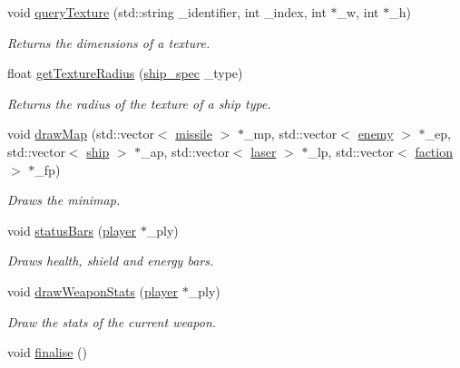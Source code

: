 \begin{DoxyCompactItemize}
\item 
void \hyperlink{classrenderer_a70a52c25aab83762d2e6a9e89a7e3f68}{query\-Texture} (std\-::string \-\_\-identifier, int \-\_\-index, int $\ast$\-\_\-w, int $\ast$\-\_\-h)
\begin{DoxyCompactList}\small\item\em Returns the dimensions of a texture. \end{DoxyCompactList}\item 
float \hyperlink{classrenderer_a560b721679d96689a77155fb4d2bf36a}{get\-Texture\-Radius} (\hyperlink{ship_8hpp_af74a63841701826d661cb9809aaf7092}{ship\-\_\-spec} \-\_\-type)
\begin{DoxyCompactList}\small\item\em Returns the radius of the texture of a ship type. \end{DoxyCompactList}\item 
void \hyperlink{classrenderer_a705585261bc8aeca559e96cfe558712e}{draw\-Map} (std\-::vector$<$ \hyperlink{classmissile}{missile} $>$ $\ast$\-\_\-mp, std\-::vector$<$ \hyperlink{classenemy}{enemy} $>$ $\ast$\-\_\-ep, std\-::vector$<$ \hyperlink{classship}{ship} $>$ $\ast$\-\_\-ap, std\-::vector$<$ \hyperlink{classlaser}{laser} $>$ $\ast$\-\_\-lp, std\-::vector$<$ \hyperlink{structfaction}{faction} $>$ $\ast$\-\_\-fp)
\begin{DoxyCompactList}\small\item\em Draws the minimap. \end{DoxyCompactList}\item 
void \hyperlink{classrenderer_a78e5ab3b46c708c369fddeac1202c692}{status\-Bars} (\hyperlink{classplayer}{player} $\ast$\-\_\-ply)
\begin{DoxyCompactList}\small\item\em Draws health, shield and energy bars. \end{DoxyCompactList}\item 
void \hyperlink{classrenderer_a0e00b3fbe340e2f152856bd3686b563a}{draw\-Weapon\-Stats} (\hyperlink{classplayer}{player} $\ast$\-\_\-ply)
\begin{DoxyCompactList}\small\item\em Draw the stats of the current weapon. \end{DoxyCompactList}\item 
\hypertarget{classrenderer_ae42befa84c772f9a79624411dc31a7dc}{void \hyperlink{classrenderer_ae42befa84c772f9a79624411dc31a7dc}{finalise} ()}\label{classrenderer_ae42befa84c772f9a79624411dc31a7dc}


\end{DoxyCompactItemize}
